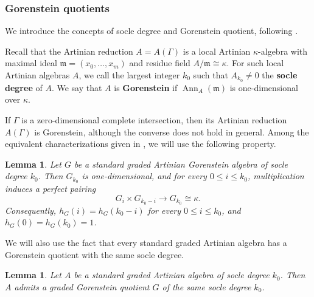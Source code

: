 \documentclass[11pt]{amsart}
\newtheorem{lemma}[theorem]{Lemma}
\theoremstyle{definition}
\newcommand{\PP}{\mathbb{P}}
\begin{document}
\subsubsection{Gorenstein quotients}
We introduce the concepts of socle degree and Gorenstein quotient, following \cite[Section 1.3]{eisenbud1996cayley}.


Recall that the Artinian reduction $A=A(\Gamma)$ is a local
Artinian $\kappa$-algebra with maximal ideal
$\mathfrak m=(x_0,\ldots,x_m)$ and residue field
$A/\mathfrak m\cong\kappa$. For such local Artinian algebras $A$, 
we call the largest integer $k_0$ such that $A_{k_0}\neq 0$
the \textbf{socle degree} of $A$. We say that
$A$ is \textbf{Gorenstein} if
$\operatorname{Ann}_A(\mathfrak m)$ is one-dimensional over
$\kappa$.


If $\Gamma$ is a zero-dimensional complete intersection, then
its Artinian reduction $A(\Gamma)$ is Gorenstein, although
the converse does not hold in general.
Among the equivalent characterizations given in
\cite[Section~1.3]{eisenbud1996cayley}, we will use the
following property.

\begin{lemma}\cite[Proposition 7]{eisenbud1996cayley}\label{lem:gorenstein-symmetry}
Let $G$ be a standard graded Artinian Gorenstein algebra of
socle degree $k_0$. Then $G_{k_0}$ is one-dimensional, and
for every $0\leq i\leq k_0$, multiplication induces a perfect
pairing
\[
G_i\times G_{k_0-i}\longrightarrow G_{k_0}\cong\kappa.
\]
Consequently, $h_G(i)=h_G(k_0-i)$ for every $0\leq i\leq k_0$,
and $h_G(0)=h_G(k_0)=1$.
\end{lemma}

We will also use the fact that every standard graded Artinian algebra has a Gorenstein quotient
with the same socle degree.

\begin{lemma}\cite[Proof of Proposition 12]{eisenbud1996cayley}\label{lem: gorenstein-quotient}
Let $A$ be a standard graded Artinian algebra of socle degree
$k_0$. Then $A$ admits a graded Gorenstein quotient $G$ of the same
socle degree $k_0$.
\end{lemma}

\end{document}
